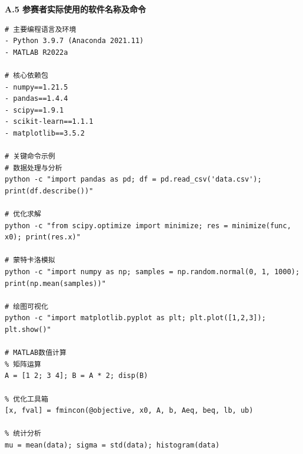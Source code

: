\documentclass[12pt,a4paper]{article}
\begin{document}
{\fontsize{12pt}{14pt}\bfseries A.5 参赛者实际使用的软件名称及命令}

{\fontsize{10pt}{12pt}\ttfamily
\begin{verbatim}
# 主要编程语言及环境
- Python 3.9.7 (Anaconda 2021.11)
- MATLAB R2022a

# 核心依赖包
- numpy==1.21.5
- pandas==1.4.4
- scipy==1.9.1
- scikit-learn==1.1.1
- matplotlib==3.5.2

# 关键命令示例
# 数据处理与分析
python -c "import pandas as pd; df = pd.read_csv('data.csv'); print(df.describe())"

# 优化求解
python -c "from scipy.optimize import minimize; res = minimize(func, x0); print(res.x)"

# 蒙特卡洛模拟
python -c "import numpy as np; samples = np.random.normal(0, 1, 1000); print(np.mean(samples))"

# 绘图可视化
python -c "import matplotlib.pyplot as plt; plt.plot([1,2,3]); plt.show()"

# MATLAB数值计算
% 矩阵运算
A = [1 2; 3 4]; B = A * 2; disp(B)

% 优化工具箱
[x, fval] = fmincon(@objective, x0, A, b, Aeq, beq, lb, ub)

% 统计分析
mu = mean(data); sigma = std(data); histogram(data)
\end{verbatim}
}
\end{document}
